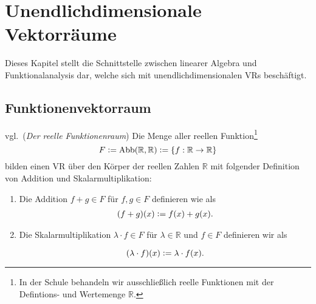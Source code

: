 \chapter{Unendlichdimensionale Vektorräume}
\label{sec:unendliche VRs}
Dieses Kapitel stellt die Schnittstelle zwischen linearer Algebra und Funktionalanalysis dar, welche sich mit unendlichdimensionalen \aclp{VR} beschäftigt. 
\section{Funktionenvektorraum}

\begin{Satz} vgl.\,\cite[S. 28 f., 6.2]{Skript} (\emph{Der reelle Funktionenraum}) \label{funktionenraum}Die Menge aller reellen Funktion\footnote{In der Schule behandeln wir ausschließlich reelle Funktionen mit der Defintions- und Wertemenge $\mathbb{R}$.}
\[F \vcentcolon=  \operatorname{Abb}(\mathbb{R}, \mathbb{R})\vcentcolon= \{f : \mathbb{R} \rightarrow\mathbb{R}\}\]
bilden einen \acl{VR} über den Körper der reellen Zahlen $\mathbb{R}$ mit folgender Definition von Addition und Skalarmultiplikation:
\begin{enumerate}
	\item Die Addition $f+g\in F$ für $f,g \in F$ definieren wie als
	\begin{align*} (f+g)(x) \vcentcolon= f(x)+ g(x)\text{.}
	\end{align*}
	
	\item Die Skalarmultiplikation $\lambda \cdot f \in F$ für $\lambda \in \mathbb{R}$ und $f \in F$ definieren wir als 
	
	\[(\lambda \cdot f)(x) \vcentcolon= \lambda \cdot f (x)\text{.}\]		
\end{enumerate}
\end{Satz}

